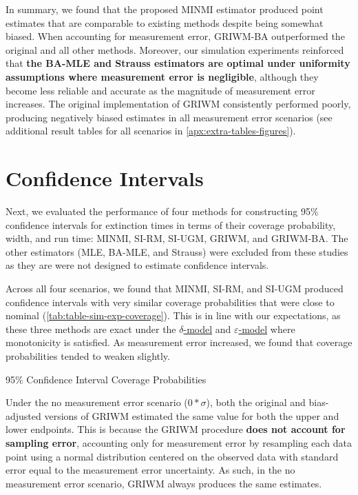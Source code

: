 In summary, we found that the proposed MINMI estimator produced point estimates that are comparable to existing methods despite being somewhat biased. When accounting for measurement error, GRIWM-BA outperformed the original and all other methods. Moreover, our simulation experiments reinforced that \textbf{the BA-MLE and Strauss estimators are optimal under uniformity assumptions where measurement error is negligible}, although they become less reliable and accurate as the magnitude of measurement error increases. The original implementation of GRIWM consistently performed poorly, producing negatively biased estimates in all measurement error scenarios (see additional result tables for all scenarios in \autoref{apx:extra-tables-figures}).

\section{Confidence Intervals}

Next, we evaluated the performance of four methods for constructing 95\% confidence intervals for extinction times in terms of their coverage probability, width, and run time: MINMI, SI-RM, SI-UGM, GRIWM, and GRIWM-BA. The other estimators (MLE, BA-MLE, and Strauss) were excluded from these studies as they are were not designed to estimate confidence intervals.

Across all four scenarios, we found that MINMI, SI-RM, and SI-UGM produced confidence intervals with very similar coverage probabilities that were close to nominal (\autoref{tab:table-sim-exp-coverage}). This is in line with our expectations, as these three methods are exact under the \hyperref[model: no-measurement-error]{$\delta$-model} and \hyperref[model: measurement-error]{$\varepsilon$-model} where monotonicity is satisfied. As measurement error increased, we found that coverage probabilities tended to weaken slightly.
\begin{table}[ht]
    \centering
    \caption{95\% Confidence Interval Coverage Probabilities}
    
    \label{tab:table-sim-exp-coverage}
    \vspace{-4mm}
\end{table}

Under the no measurement error scenario ($0*\sigma$), both the original and bias-adjusted versions of GRIWM estimated the same value for both the upper and lower endpoints. This is because the GRIWM procedure \textbf{does not account for sampling error}, accounting only for measurement error by resampling each data point using a normal distribution centered on the observed data with standard error equal to the measurement error uncertainty. As such, in the no measurement error scenario, GRIWM always produces the same estimates.

